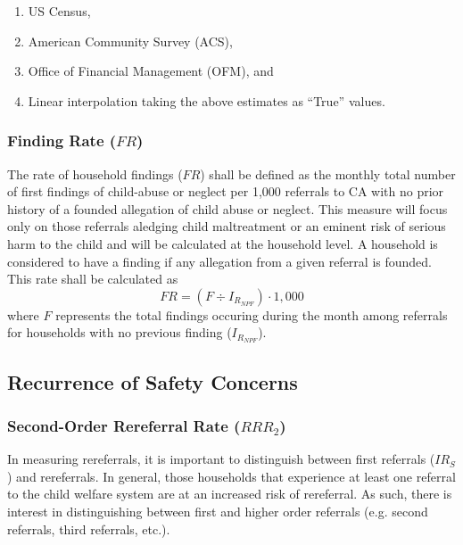 \documentclass[12pt]{article}\usepackage[]{graphicx}\usepackage[]{color}
\begin{document}
\begin{enumerate}
  \item US Census,
  \item American Community Survey (ACS), 
  \item Office of Financial Management (OFM), and 
  \item Linear interpolation taking the above estimates as ``True'' values. 
\end{enumerate}

\subsubsection{Finding Rate ($FR$)}

The rate of household findings ($FR$) shall be defined as the monthly total number of first findings of child-abuse or neglect per 1,000 referrals to CA with no prior history of a founded allegation of child abuse or neglect. This measure will focus only on those referrals aledging child maltreatment or an eminent risk of serious harm to the child and will be calculated at the household level. A household is considered to have a finding if any allegation from a given referral is founded. This rate shall be calculated as 
\begin{equation}\label{eq:FR}
FR = (F \div I_{R_{NPF}}) \cdot 1,000
\end{equation}
where $F$ represents the total findings occuring during the month among referrals for households with no previous finding ($I_{R_{NPF}}$). 


\subsection{Recurrence of Safety Concerns}

\subsubsection{Second-Order Rereferral Rate ($RRR_2$)}

In measuring rereferrals, it is important to distinguish between first referrals ($IR_S$) and rereferrals. In general, those households that experience at least one referral to the child welfare system are at an increased risk of rereferral. As such, there is interest in distinguishing between first and higher order referrals (e.g. second referrals, third referrals, etc.). 
\end{document}
